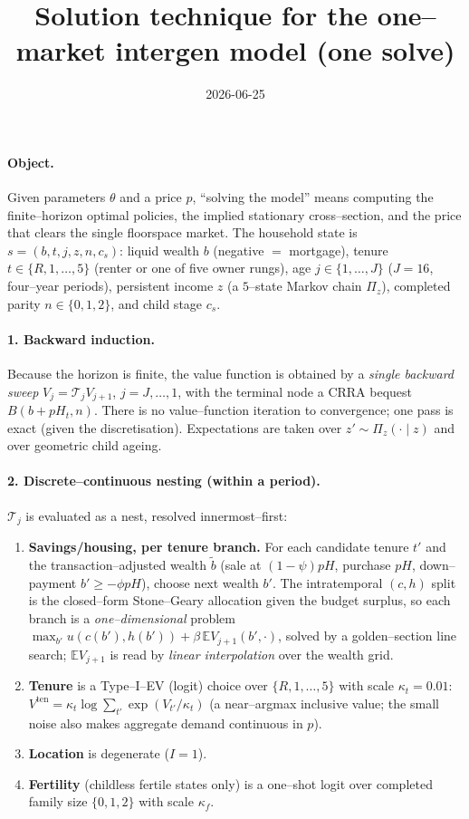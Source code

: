 \documentclass[11pt]{article}
\title{\vspace{-2.5em}Solution technique for the one--market intergen model (one solve)}
\author{}\date{2026-06-25}
\begin{document}
\maketitle\vspace{-3em}

\paragraph{Object.} Given parameters $\theta$ and a price $p$, ``solving the model'' means computing the
finite--horizon optimal policies, the implied stationary cross--section, and the price that clears the
single floorspace market. The household state is
$s=(b,t,j,z,n,c_s)$: liquid wealth $b$ (negative $=$ mortgage), tenure $t\in\{R,1,\dots,5\}$ (renter or
one of five owner rungs), age $j\in\{1,\dots,J\}$ ($J{=}16$, four--year periods), persistent income $z$
(a $5$--state Markov chain $\Pi_z$), completed parity $n\in\{0,1,2\}$, and child stage $c_s$.

\paragraph{1. Backward induction.} Because the horizon is finite, the value function is obtained by a
\emph{single backward sweep} $V_j=\mathcal T_j V_{j+1}$, $j=J,\dots,1$, with the terminal node a CRRA
bequest $B(b+pH_t,n)$. There is no value--function iteration to convergence; one pass is exact (given the
discretisation). Expectations are taken over $z'\sim\Pi_z(\cdot\mid z)$ and over geometric child ageing.

\paragraph{2. Discrete--continuous nesting (within a period).} $\mathcal T_j$ is evaluated as a nest,
resolved innermost--first:
\begin{enumerate}[label=(\alph*)]
\item \textbf{Savings/housing, per tenure branch.} For each candidate tenure $t'$ and the
transaction--adjusted wealth $\tilde b$ (sale at $(1{-}\psi)pH$, purchase $pH$, down--payment
$b'\ge-\phi pH$), choose next wealth $b'$. The intratemporal $(c,h)$ split is the closed--form
Stone--Geary allocation given the budget surplus, so each branch is a \emph{one--dimensional} problem
\(\max_{b'} u(c(b'),h(b'))+\beta\,\mathbb E V_{j+1}(b',\cdot)\), solved by a golden--section line search;
$\mathbb E V_{j+1}$ is read by \emph{linear interpolation} over the wealth grid.
\item \textbf{Tenure} is a Type--I--EV (logit) choice over $\{R,1,\dots,5\}$ with scale
$\kappa_t{=}0.01$: $V^{\mathrm{ten}}=\kappa_t\log\sum_{t'}\exp(V_{t'}/\kappa_t)$ (a near--argmax inclusive
value; the small noise also makes aggregate demand continuous in $p$).
\item \textbf{Location} is degenerate ($I{=}1$).
\item \textbf{Fertility} (childless fertile states only) is a one--shot logit over completed family size
$\{0,1,2\}$ with scale $\kappa_f$.
\end{enumerate}
\end{document}
